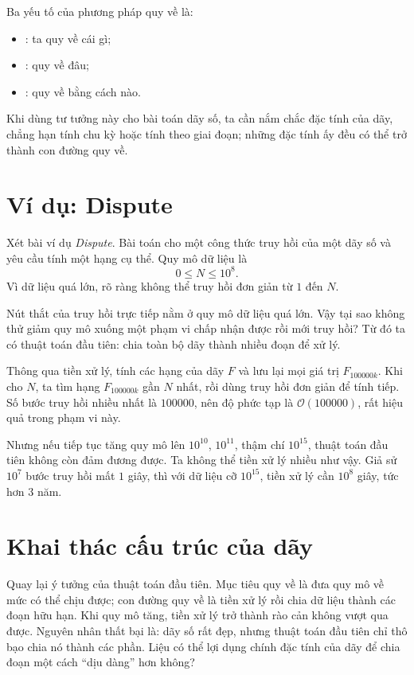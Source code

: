 \documentclass[11pt]{article}
\newcommand{\Oh}{\mathcal{O}}
\begin{document}
Ba yếu tố của phương pháp quy về là:
\begin{itemize}
  \item {}: ta quy về cái gì;
  \item {}: quy về đâu;
  \item {}: quy về bằng cách nào.
\end{itemize}

Khi dùng tư tưởng này cho bài toán dãy số, ta cần nắm chắc đặc tính của dãy,
chẳng hạn tính chu kỳ hoặc tính theo giai đoạn; những đặc tính ấy đều có thể
trở thành con đường quy về.

\section{Ví dụ: Dispute}

Xét bài ví dụ \emph{Dispute}. Bài toán cho một công thức truy hồi của một dãy
số và yêu cầu tính một hạng cụ thể. Quy mô dữ liệu là
\[
  0\le N\le 10^8.
\]
Vì dữ liệu quá lớn, rõ ràng không thể truy hồi đơn giản từ \(1\) đến \(N\).

Nút thắt của truy hồi trực tiếp nằm ở quy mô dữ liệu quá lớn. Vậy tại sao
không thử giảm quy mô xuống một phạm vi chấp nhận được rồi mới truy hồi? Từ
đó ta có thuật toán đầu tiên: chia toàn bộ dãy thành nhiều đoạn để xử lý.

Thông qua tiền xử lý, tính các hạng của dãy \(F\) và lưu lại mọi giá trị
\(F_{100000k}\). Khi cho \(N\), ta tìm hạng \(F_{100000k}\) gần \(N\) nhất,
rồi dùng truy hồi đơn giản để tính tiếp. Số bước truy hồi nhiều nhất là
\(100000\), nên độ phức tạp là \(\Oh(100000)\), rất hiệu quả trong phạm vi
này.

Nhưng nếu tiếp tục tăng quy mô lên \(10^{10}\), \(10^{11}\), thậm chí
\(10^{15}\), thuật toán đầu tiên không còn đảm đương được. Ta không thể tiền
xử lý nhiều như vậy. Giả sử \(10^7\) bước truy hồi mất \(1\) giây, thì với
dữ liệu cỡ \(10^{15}\), tiền xử lý cần \(10^8\) giây, tức hơn \(3\) năm.

\section{Khai thác cấu trúc của dãy}

Quay lại ý tưởng của thuật toán đầu tiên. Mục tiêu quy về là đưa quy mô về
mức có thể chịu được; con đường quy về là tiền xử lý rồi chia dữ liệu thành
các đoạn hữu hạn. Khi quy mô tăng, tiền xử lý trở thành rào cản không vượt
qua được. Nguyên nhân thất bại là: dãy số rất đẹp, nhưng thuật toán đầu tiên
chỉ thô bạo chia nó thành các phần. Liệu có thể lợi dụng chính đặc tính của
dãy để chia đoạn một cách ``dịu dàng'' hơn không?
\end{document}
